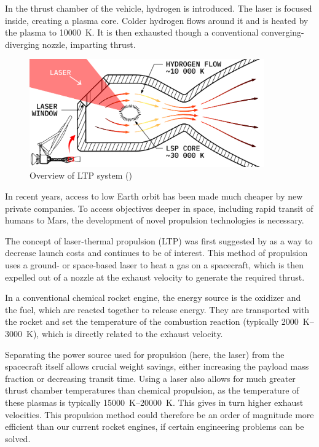         In the thrust chamber of the vehicle, hydrogen is introduced. The laser is focused inside, creating a plasma core. Colder hydrogen flows around it and is heated by the plasma to \qty{10000}{K}. It is then exhausted though a conventional converging-diverging nozzle, imparting thrust.

        \begin{figure}[h!]
            \centering
            \includegraphics[width=0.9\textwidth]{assets/2 background/chamber.pdf}
            \caption{Overview of LTP system (\textcite{duplayArgonLaserPlasmaThruster2024a})}
            \label{fig:LTP system overview}
        \end{figure}
        

        In recent years, access to low Earth orbit has been made much cheaper by new private companies. To access objectives deeper in space, including rapid transit of humans to Mars, the development of novel propulsion technologies is necessary.

        The concept of laser-thermal propulsion (LTP) was first suggested by \textcite{kantrowitzRelevanceSpace1971} as a way to decrease launch costs and continues to be of interest. This method of propulsion uses a ground- or space-based laser to heat a gas on a spacecraft, which is then expelled out of a nozzle at the exhaust velocity to generate the required thrust.

        In a conventional chemical rocket engine, the energy source is the oxidizer and the fuel, which are reacted together to release energy. They are transported with the rocket and set the temperature of the combustion reaction (typically \qtyrange{2000}{3000}{K}), which is directly related to the exhaust velocity.
        
        Separating the power source used for propulsion (here, the laser) from the spacecraft itself allows crucial weight savings, either increasing the payload mass fraction or decreasing transit time. Using a laser also allows for much greater thrust chamber temperatures than chemical propulsion, as the temperature of these plasmas is typically \qtyrange{15000}{20000}{K}. This gives in turn higher exhaust velocities. This propulsion method could therefore be an order of magnitude more efficient than our current rocket engines, if certain engineering problems can be solved.

